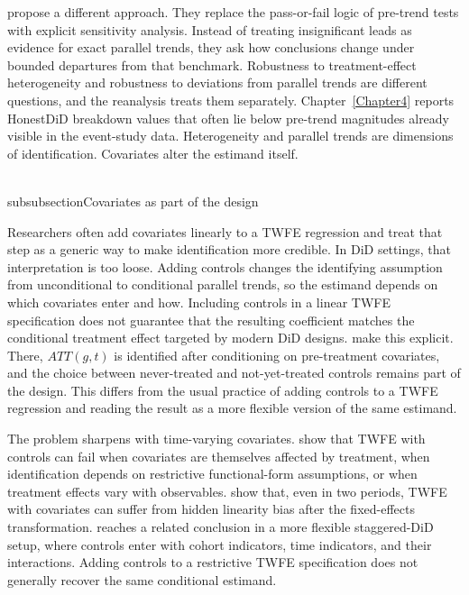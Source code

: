 \documentclass[11pt]{article}
\begin{document}
\textcite{rambachan2023more} propose a different approach. They replace the pass-or-fail logic of pre-trend tests with explicit sensitivity analysis. Instead of treating insignificant leads as evidence for exact parallel trends, they ask how conclusions change under bounded departures from that benchmark. Robustness to treatment-effect heterogeneity and robustness to deviations from parallel trends are different questions, and the reanalysis treats them separately. Chapter~\ref{Chapter4} reports HonestDiD breakdown values that often lie below pre-trend magnitudes already visible in the event-study data. Heterogeneity and parallel trends are dimensions of identification. Covariates alter the estimand itself.

\\subsubsection{Covariates as part of the design}

Researchers often add covariates linearly to a TWFE regression and treat that step as a generic way to make identification more credible. In DiD settings, that interpretation is too loose. Adding controls changes the identifying assumption from unconditional to conditional parallel trends, so the estimand depends on which covariates enter and how. Including controls in a linear TWFE specification does not guarantee that the resulting coefficient matches the conditional treatment effect targeted by modern DiD designs. \textcite{callaway2021difference} make this explicit. There, \(ATT(g,t)\) is identified after conditioning on pre-treatment covariates, and the choice between never-treated and not-yet-treated controls remains part of the design. This differs from the usual practice of adding controls to a TWFE regression and reading the result as a more flexible version of the same estimand.

The problem sharpens with time-varying covariates. \textcite{caetano2022difference} show that TWFE with controls can fail when covariates are themselves affected by treatment, when identification depends on restrictive functional-form assumptions, or when treatment effects vary with observables. \textcite{caetano_callaway2024_hiddenlinearity} show that, even in two periods, TWFE with covariates can suffer from hidden linearity bias after the fixed-effects transformation. \textcite{wooldridge2025two} reaches a related conclusion in a more flexible staggered-DiD setup, where controls enter with cohort indicators, time indicators, and their interactions. Adding controls to a restrictive TWFE specification does not generally recover the same conditional estimand.
\end{document}
